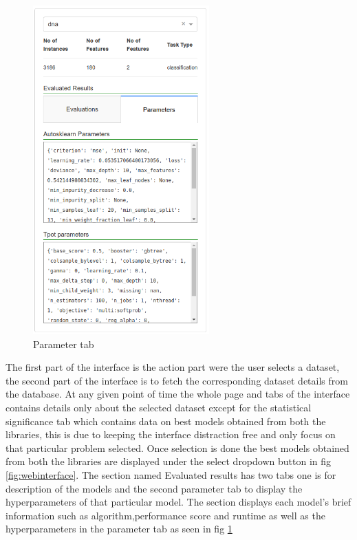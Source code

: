 \begin{figure}[!h]
    	\centering
    	\includegraphics[width=0.4\linewidth]{thesis_template/images/parametersInterface.png}
    	\caption{Parameter tab}
    	\label{fig:parameters}
        \end{figure}


The first part of the interface is the action part were the user selects a dataset, the second part of the interface is to fetch the corresponding dataset details from the database. At any given point of time the whole page and tabs of the interface contains details only about the selected dataset except for the statistical significance tab which contains data on best models obtained from both the libraries, this is due to keeping the interface distraction free and only focus on that particular problem selected. Once selection is done the best models obtained from both the libraries are displayed under the select dropdown button in fig \ref{fig:webinterface}.
The section named Evaluated results has two tabs one is for description of the models and the second parameter tab to display the hyperparameters of that particular model. The section displays each model's brief information such as algorithm,performance score and runtime as well as the hyperparameters in the parameter tab as seen in fig \ref{fig:parameters} 

